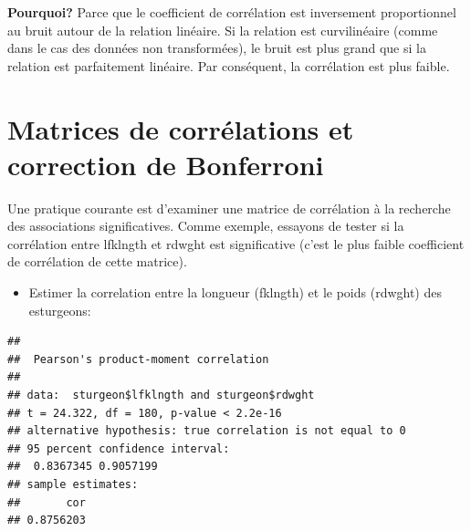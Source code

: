 \documentclass[12pt,]{book}
\newenvironment{Shaded}{\begin{snugshade}}{\end{snugshade}}
\newcommand{\DataTypeTok}[1]{\textcolor[rgb]{0.13,0.29,0.53}{#1}}
\newcommand{\KeywordTok}[1]{\textcolor[rgb]{0.13,0.29,0.53}{\textbf{#1}}}
\newcommand{\NormalTok}[1]{#1}
\newcommand{\OperatorTok}[1]{\textcolor[rgb]{0.81,0.36,0.00}{\textbf{#1}}}
\newcommand{\StringTok}[1]{\textcolor[rgb]{0.31,0.60,0.02}{#1}}
\providecommand{\tightlist}{%
  \setlength{\itemsep}{0pt}\setlength{\parskip}{0pt}}
\begin{document}
\textbf{Pourquoi?} Parce que le coefficient de corrélation est inversement proportionnel au bruit autour de la relation linéaire.
Si la relation est curvilinéaire (comme dans le cas des données non transformées), le bruit est plus grand que si la relation est parfaitement linéaire.
Par conséquent, la corrélation est plus faible.

\hypertarget{matrices-de-corruxe9lations-et-correction-de-bonferroni}{%
\section{Matrices de corrélations et correction de Bonferroni}\label{matrices-de-corruxe9lations-et-correction-de-bonferroni}}

Une pratique courante est d'examiner une matrice de corrélation à la recherche des associations significatives.
Comme exemple, essayons de tester si la corrélation entre lfklngth et rdwght est significative (c'est le plus faible coefficient de corrélation de cette matrice).

\begin{itemize}
\tightlist
\item
  Estimer la correlation entre la longueur (fklngth) et le poids (rdwght) des esturgeons:
\end{itemize}

\begin{Shaded}
\end{Shaded}

\begin{verbatim}
## 
##  Pearson's product-moment correlation
## 
## data:  sturgeon$lfklngth and sturgeon$rdwght
## t = 24.322, df = 180, p-value < 2.2e-16
## alternative hypothesis: true correlation is not equal to 0
## 95 percent confidence interval:
##  0.8367345 0.9057199
## sample estimates:
##       cor 
## 0.8756203
\end{verbatim}
\end{document}
